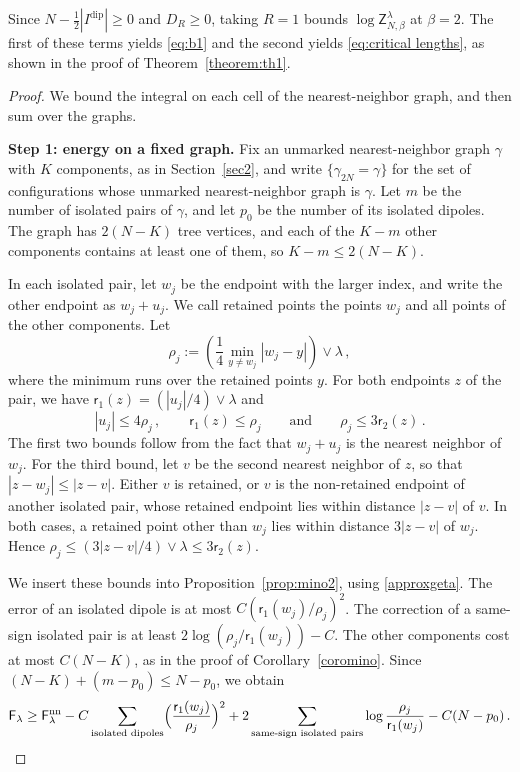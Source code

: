 \documentclass[a4paper,10pt,leqno]{amsart}
\numberwithin{equation}{section}
\def\Z{\mathsf{Z}_{N,\beta}^{\lambda}}
\def\F{\mathsf{F}}
\def\rr{\mathsf{r}}
\newcommand{\dip}{\mathrm{dip}}
\def\nn{\mathrm{nn}}
\begin{document}
Since $N-\frac12|I^{\dip}|\ge0$ and $D_R\ge0$, taking $R=1$ bounds $\log\Z$ at $\beta=2$. The first of these terms yields \eqref{eq:b1} and the second yields \eqref{eq:critical lengths}, as shown in the proof of Theorem~\ref{theorem:th1}.

\begin{proof}
  We bound the integral on each cell of the nearest-neighbor graph, and then sum over the graphs.

  \smallskip
  \noindent
  \textbf{Step 1: energy on a fixed graph.}
  Fix an unmarked nearest-neighbor graph $\gamma$ with $K$ components, as in Section~\ref{sec2}, and write $\{\gamma_{2N}=\gamma\}$ for the set of configurations whose unmarked nearest-neighbor graph is $\gamma$. Let $m$ be the number of isolated pairs of $\gamma$, and let $p_0$ be the number of its isolated dipoles. The graph has $2(N-K)$ tree vertices, and each of the $K-m$ other components contains at least one of them, so $K-m\le2(N-K)$.

  In each isolated pair, let $w_j$ be the endpoint with the larger index, and write the other endpoint as $w_j+u_j$. We call retained points the points $w_j$ and all points of the other components. Let
  \[
    \rho_j:=\left(\frac14\min_{y\ne w_j}|w_j-y|\right)\vee\lambda\,,
  \]
  where the minimum runs over the retained points $y$. For both endpoints $z$ of the pair, we have $\rr_1(z)=(|u_j|/4)\vee\lambda$ and
  \[
    |u_j|\le4\rho_j\,,\qquad \rr_1(z)\le\rho_j\qquad\text{and}\qquad \rho_j\le3\rr_2(z)\,.
  \]
  The first two bounds follow from the fact that $w_j+u_j$ is the nearest neighbor of $w_j$. For the third bound, let $v$ be the second nearest neighbor of $z$, so that $|z-w_j|\le|z-v|$. Either $v$ is retained, or $v$ is the non-retained endpoint of another isolated pair, whose retained endpoint lies within distance $|z-v|$ of $v$. In both cases, a retained point other than $w_j$ lies within distance $3|z-v|$ of $w_j$. Hence $\rho_j\le(3|z-v|/4)\vee\lambda\le3\rr_2(z)$.

  We insert these bounds into Proposition~\ref{prop:mino2}, using \eqref{approxgeta}. The error of an isolated dipole is at most $C(\rr_1(w_j)/\rho_j)^2$. The correction of a same-sign isolated pair is at least $2\log(\rho_j/\rr_1(w_j))-C$. The other components cost at most $C(N-K)$, as in the proof of Corollary~\ref{coromino}. Since $(N-K)+(m-p_0)\le N-p_0$, we obtain
  \[
    \F_\lambda\ge\F_\lambda^{\nn}
    -C\sum_{\text{isolated dipoles}}\Bigl(\frac{\rr_1(w_j)}{\rho_j}\Bigr)^2
    +2\sum_{\text{same-sign isolated pairs}}\log\frac{\rho_j}{\rr_1(w_j)}
    -C(N-p_0)\,.
  \]


\end{proof}
\end{document}
